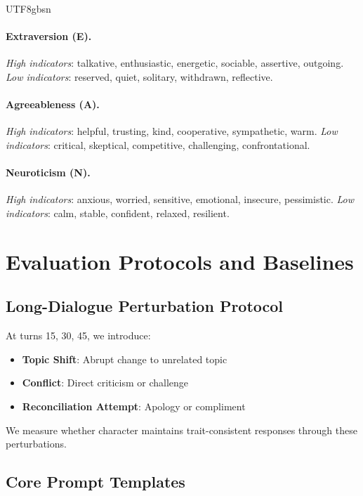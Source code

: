 \documentclass[11pt]{article}
\begin{document}
\begin{CJK*}{UTF8}{gbsn}
\paragraph{Extraversion (E).} \textit{High indicators}: talkative, enthusiastic, energetic, sociable, assertive, outgoing. \textit{Low indicators}: reserved, quiet, solitary, withdrawn, reflective.

\paragraph{Agreeableness (A).} \textit{High indicators}: helpful, trusting, kind, cooperative, sympathetic, warm. \textit{Low indicators}: critical, skeptical, competitive, challenging, confrontational.

\paragraph{Neuroticism (N).} \textit{High indicators}: anxious, worried, sensitive, emotional, insecure, pessimistic. \textit{Low indicators}: calm, stable, confident, relaxed, resilient.

\section{Evaluation Protocols and Baselines}
\label{sec:exp_protocols}

\subsection{Long-Dialogue Perturbation Protocol}
\label{sec:longdialogue}

At turns 15, 30, 45, we introduce:
\begin{itemize}
    \item \textbf{Topic Shift}: Abrupt change to unrelated topic
    \item \textbf{Conflict}: Direct criticism or challenge
    \item \textbf{Reconciliation Attempt}: Apology or compliment
\end{itemize}

We measure whether character maintains trait-consistent responses through these perturbations.

\subsection{Core Prompt Templates}
\label{sec:prompts}


\end{CJK*}
\end{document}
